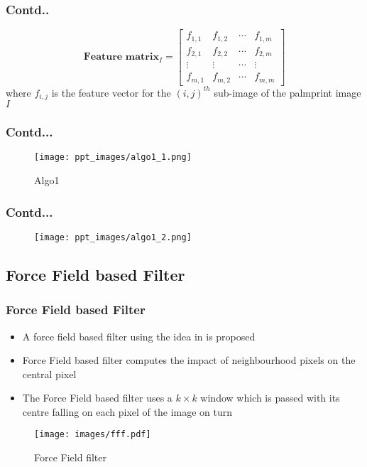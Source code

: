 \documentclass{beamer}
\begin{document}
\begin{frame}
\frametitle{Contd..}
\begin{equation}
  \textbf{Feature matrix}_{I} = \begin{bmatrix} f_{1,1} & f_{1,2} & \cdots & f_{1,m}\\ f_{2,1} & f_{2,2} & \cdots & f_{2,m}\\ \vdots & \vdots & \cdots & \vdots \\ f_{m,1} & f_{m,2} & \cdots & f_{m,m}\end{bmatrix}
\end{equation}
where $f_{i,j}$ is the feature vector for the $(i,j)^{th}$ sub-image of the palmprint image $I$
\end{frame}

\begin{frame}
\frametitle{Contd...}
	\begin{figure}[htp]
\begin{center}
\texttt{[image: ppt\_images/algo1\_1.png]}
\caption{Algo1\label{alg1} }
\end{center}
\end{figure}
\end{frame}

\begin{frame}
\frametitle{Contd...}
	\begin{figure}[htp]
\begin{center}
\texttt{[image: ppt\_images/algo1\_2.png]}
\end{center}
\end{figure}
\end{frame}

\subsection{Force Field based Filter}
\begin{frame}
\frametitle{Force Field based Filter}
\begin{itemize}
	\item A force field based filter using the idea in \cite{forcefield} is proposed 
   	\item Force Field based filter computes the impact of neighbourhood pixels on the central pixel 
   	\item The Force Field based filter uses a $k \times k$ window which is passed with its centre falling on 
each pixel of the image on turn 
\end{itemize}
\begin{figure}[htp]
\begin{center}
\texttt{[image: images/fff.pdf]}
\caption{Force Field filter
\label{fff} }
\end{center}
\end{figure}
\end{frame}
\end{document}

